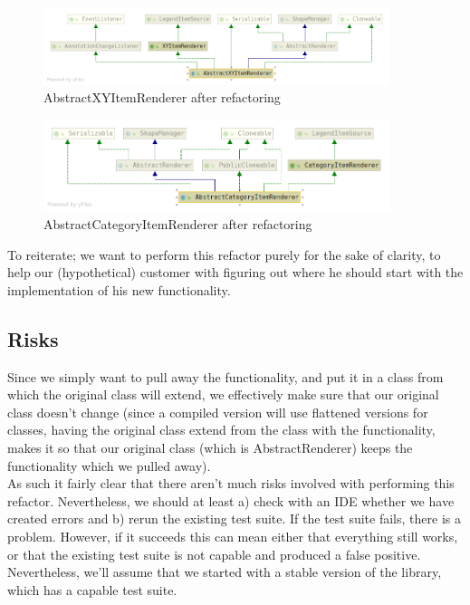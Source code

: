 \documentclass{article}
\begin{document}
\begin{figure}[H]
\centering
	\includegraphics[width=0.9\textwidth]{AbstractXYItemRendererAfter.png}
	\caption{AbstractXYItemRenderer after refactoring}
\end{figure}

\begin{figure}[H]
\centering
	\includegraphics[width=0.9\textwidth]{AbstractCategoryItemRendererAfter.png}
	\caption{AbstractCategoryItemRenderer after refactoring}
\end{figure}

To reiterate; we want to perform this refactor purely for the sake of clarity, to help our (hypothetical) customer with figuring out where he should start with the implementation of his new functionality.

\subsection{Risks}

Since we simply want to pull away the functionality, and put it in a class from which the original class will extend, we effectively make sure that our original class doesn't change (since a compiled version will use flattened versions for classes, having the original class extend from the class with the functionality, makes it so that our original class (which is AbstractRenderer) keeps the functionality which we pulled away).\\

As such it fairly clear that there aren't much risks involved with performing this refactor. Nevertheless, we should at least a) check with an IDE whether we have created errors and b) rerun the existing test suite. If the test suite fails, there is a problem. However, if it succeeds this can mean either that everything still works, or that the existing test suite is not capable and produced a false positive. Nevertheless, we'll assume that we started with a stable version of the library, which has a capable test suite.
\end{document}
